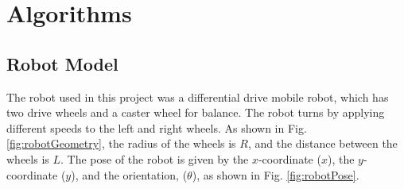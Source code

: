 \chapter{Algorithms}
\label{ch: Chapter4}

\section{Robot Model}\label{sec:robotModel}
The robot used in this project was a differential drive mobile robot, which has two drive wheels and a caster wheel for balance. The robot turns by applying different speeds to the left and right wheels. As shown in Fig. \ref{fig:robotGeometry}, the radius of the wheels is $R$, and the distance between the wheels is $L$. The pose of the robot is given by the $x$-coordinate ($x$), the $y$-coordinate ($y$), and the orientation, ($\theta$), as shown in Fig. \ref{fig:robotPose}.
